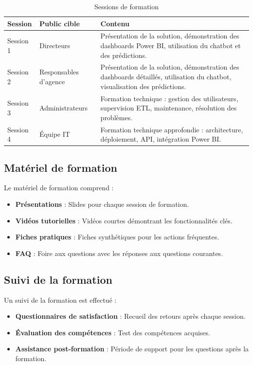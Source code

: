 \begin{table}[H]
\centering
\begin{tabular}{|p{3cm}|p{4.5cm}|p{6cm}|}
\hline
\textbf{Session} & \textbf{Public cible} & \textbf{Contenu} \\
\hline
Session 1 & Directeurs & Présentation de la solution, démonstration des dashboards Power BI, utilisation du chatbot et des prédictions. \\
\hline
Session 2 & Responsables d'agence & Présentation de la solution, démonstration des dashboards détaillés, utilisation du chatbot, visualisation des prédictions. \\
\hline
Session 3 & Administrateurs & Formation technique : gestion des utilisateurs, supervision ETL, maintenance, résolution des problèmes. \\
\hline
Session 4 & Équipe IT & Formation technique approfondie : architecture, déploiement, API, intégration Power BI. \\
\hline
\end{tabular}
\caption{Sessions de formation}
\label{tab:formation-sessions}
\end{table}

\subsection{Matériel de formation}

Le matériel de formation comprend :

\begin{itemize}
    \item \textbf{Présentations} : Slides pour chaque session de formation.
    \item \textbf{Vidéos tutorielles} : Vidéos courtes démontrant les fonctionnalités clés.
    \item \textbf{Fiches pratiques} : Fiches synthétiques pour les actions fréquentes.
    \item \textbf{FAQ} : Foire aux questions avec les réponses aux questions courantes.
\end{itemize}

\subsection{Suivi de la formation}

Un suivi de la formation est effectué :

\begin{itemize}
    \item \textbf{Questionnaires de satisfaction} : Recueil des retours après chaque session.
    \item \textbf{Évaluation des compétences} : Test des compétences acquises.
    \item \textbf{Assistance post-formation} : Période de support pour les questions après la formation.
\end{itemize}

